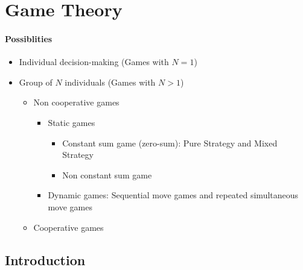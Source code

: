 \section{Game Theory}

\paragraph{Possiblities}
\begin{itemize}
    \item Individual decision-making (Games with $N=1$)
    \item Group of $N$ individuals (Games with $N>1$)
        \begin{itemize}
            \item Non cooperative games
                \begin{itemize}
                    \item Static games
                        \begin{itemize}
                            \item Constant sum game (zero-sum):
                                Pure Strategy and Mixed Strategy
                            \item Non constant sum game
                        \end{itemize}
                    \item Dynamic games:
                        Sequential move games and repeated simultaneous move games
                \end{itemize}
            \item Cooperative games
        \end{itemize}
\end{itemize}

\subsection{Introduction}

